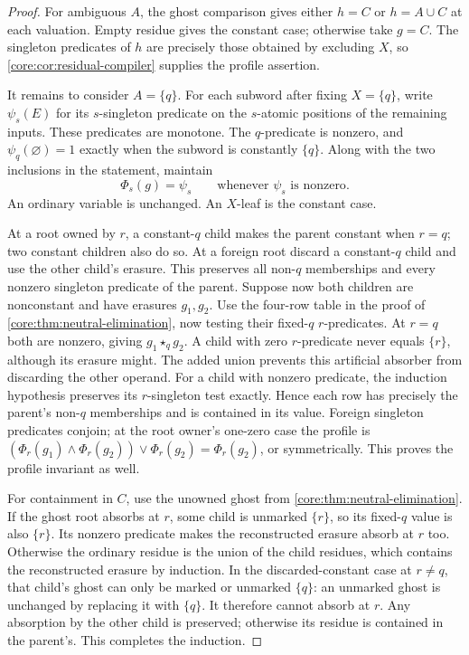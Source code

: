 \begin{proof}
For ambiguous $A$, the ghost comparison gives either $h=C$ or
$h=A\cup C$ at each valuation. Empty residue gives the constant case;
otherwise take $g=C$. The singleton predicates of $h$ are precisely
those obtained by excluding $X$, so
\cref{core:cor:residual-compiler} supplies the profile assertion.

It remains to consider $A=\{q\}$.
For each subword after fixing $X=\{q\}$, write $\psi_s(E)$ for its
$s$-singleton predicate on the $s$-atomic positions of the remaining
inputs. These predicates are monotone. The $q$-predicate is nonzero,
and $\psi_q(\varnothing)=1$ exactly when the subword is constantly
$\{q\}$. Along with the two inclusions in the statement, maintain
\[
 \Phi_s(g)=\psi_s\qquad\text{whenever }\psi_s\text{ is nonzero}.
\]
An ordinary variable is unchanged. An $X$-leaf is the constant case.

At a root owned by $r$, a constant-$q$ child makes the parent constant
when $r=q$; two constant children also do so. At a foreign root discard
a constant-$q$ child and use the other child's erasure. This preserves
all non-$q$ memberships and every nonzero singleton predicate of the
parent. Suppose now both children are nonconstant and have erasures
$g_1,g_2$. Use the four-row table in the proof of
\cref{core:thm:neutral-elimination}, now testing their fixed-$q$
$r$-predicates. At $r=q$ both are nonzero, giving $g_1\star_qg_2$.
A child with zero $r$-predicate never equals $\{r\}$, although its
erasure might. The added union prevents this artificial absorber from
discarding the other operand. For a child with nonzero predicate, the
induction hypothesis preserves its $r$-singleton test exactly. Hence
each row has precisely the parent's non-$q$ memberships and is contained
in its value. Foreign singleton predicates conjoin; at the root owner's
one-zero case the profile is
$(\Phi_r(g_1)\land\Phi_r(g_2))\lor\Phi_r(g_2)=\Phi_r(g_2)$,
or symmetrically. This proves the profile invariant as well.

For containment in $C$, use the unowned ghost from
\cref{core:thm:neutral-elimination}. If the ghost root absorbs at $r$,
some child is unmarked $\{r\}$, so its fixed-$q$ value is also
$\{r\}$. Its nonzero predicate makes the reconstructed erasure absorb
at $r$ too. Otherwise the ordinary residue is the union of the child
residues, which contains the reconstructed erasure by induction. In the
discarded-constant case at $r\ne q$, that child's ghost can only be
marked or unmarked $\{q\}$: an unmarked ghost is unchanged by replacing
it with $\{q\}$. It therefore cannot absorb at $r$. Any absorption by
the other child is preserved; otherwise its residue is contained in the
parent's. This completes the induction.
\end{proof}

